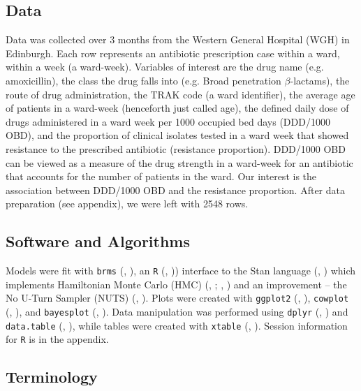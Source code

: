 \documentclass[11pt,twoside]{article}
\numberwithin{Theorem}{section}
\numberwithin{Definition}{section}
\numberwithin{Lemma}{section}
\numberwithin{Algorithm}{section}
\numberwithin{equation}{section}
\begin{document}
\subsection{Data}

Data was collected over 3 months from the Western General Hospital (WGH) in Edinburgh. Each row represents an antibiotic prescription case within a ward, within a week (a ward-week). Variables of interest are the drug name (e.g. amoxicillin), the class the drug falls into (e.g. Broad penetration $\beta$-lactams), the route of drug administration, the TRAK code (a ward identifier), the average age of patients in a ward-week (henceforth just called age), the defined daily dose of drugs administered in a ward week per 1000 occupied bed days (DDD/1000 OBD), and the proportion of clinical isolates tested in a ward week that showed resistance to the prescribed antibiotic (resistance proportion). DDD/1000 OBD can be viewed as a measure of the drug strength in a ward-week for an antibiotic that accounts for the number of patients in the ward. Our interest is the association between DDD/1000 OBD and the resistance proportion. After data preparation (see appendix), we were left with 2548 rows. 



\subsection{Software and Algorithms}

Models were fit with \texttt{brms} (\citeauthor{Burknerbrms2}, \citeyear{Burknerbrms2}), an \texttt{R} (\citeauthor{RLanguage}, \citeyear{RLanguage})) interface to the Stan language (\citeauthor{Stan_Docs}, \citeyear{Stan_Docs}) which implements Hamiltonian Monte Carlo (HMC) (\citeauthor{DuaneHMC}, \citeyear{DuaneHMC}; \citeauthor{NealHMC}, \citeyear{NealHMC}) and an improvement -- the No U-Turn Sampler (NUTS) (\citeauthor{Hoffman2014}, \citeyear{Hoffman2014}). Plots were created with \texttt{ggplot2} (\citeauthor{ggplot2}, \citeyear{ggplot2}), \texttt{cowplot} (\citeauthor{cowplot}, \citeyear{cowplot}), and \texttt{bayesplot} (\citeauthor{bayesplot}, \citeyear{bayesplot}). Data manipulation was performed using \texttt{dplyr}  (\citeauthor{dplyr}, \citeyear{dplyr}) and \texttt{data.table} (\citeauthor{datatable}, \citeyear{datatable}), while tables were created with \texttt{xtable} (\citeauthor{xtable}, \citeyear{xtable}). Session information for \texttt{R} is in the appendix. 

\subsection{Terminology}
\end{document}
